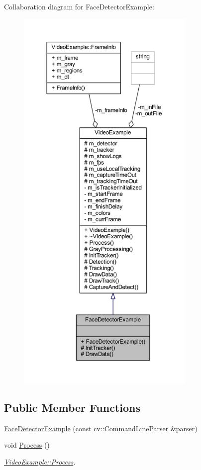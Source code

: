 Collaboration diagram for Face\+Detector\+Example\+:\nopagebreak
\begin{figure}[H]
\begin{center}
\leavevmode
\includegraphics[height=550pt]{class_face_detector_example__coll__graph}
\end{center}
\end{figure}
\subsection*{Public Member Functions}
\begin{DoxyCompactItemize}
\item 
\mbox{\hyperlink{class_face_detector_example_a3e651a54779ec22dbb9c619c0ce65550}{Face\+Detector\+Example}} (const cv\+::\+Command\+Line\+Parser \&parser)
\item 
void \mbox{\hyperlink{class_video_example_a87efc66a82c36ad3380623d30a12abf2}{Process}} ()
\begin{DoxyCompactList}\small\item\em \mbox{\hyperlink{class_video_example_a87efc66a82c36ad3380623d30a12abf2}{Video\+Example\+::\+Process}}. \end{DoxyCompactList}\end{DoxyCompactItemize}
